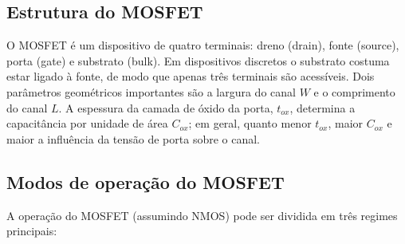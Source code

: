 \documentclass[12pt]{article}
\begin{document}
        \subsection{Estrutura do MOSFET}

            O MOSFET é um dispositivo de quatro terminais: dreno (drain), fonte (source), porta (gate) e substrato (bulk). Em dispositivos discretos o substrato costuma estar ligado à fonte, de modo que apenas três terminais são acessíveis. Dois parâmetros geométricos importantes são a largura do canal $W$ e o comprimento do canal $L$. A espessura da camada de óxido da porta, $t_{ox}$, determina a capacitância por unidade de área $C_{ox}$; em geral, quanto menor $t_{ox}$, maior $C_{ox}$ e maior a influência da tensão de porta sobre o canal.

        \subsection{Modos de operação do MOSFET}

            A operação do MOSFET (assumindo NMOS) pode ser dividida em três regimes principais:
\end{document}

